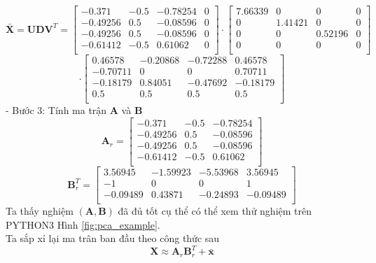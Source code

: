 \documentclass[12pt,a4paper,oneside]{report}
\numberwithin{equation}{section}
\begin{document}
\[
\bar{\mathbf{X}}=\mathbf{UDV}^{T} = \begin{bmatrix}
-0.371 & -0.5 & -0.78254 & 0 \\
-0.49256 & 0.5 & -0.08596 & 0 \\
-0.49256 & 0.5 & -0.08596 & 0 \\
-0.61412 & -0.5 & 0.61062 & 0 \\
\end{bmatrix} \cdot \begin{bmatrix}
7.66339 & 0 & 0 & 0 \\
0 & 1.41421 & 0 & 0 \\
0 & 0 & 0.52196 & 0 \\
0 & 0 & 0 & 0 \\
\end{bmatrix}
\]
\[
\cdot \begin{bmatrix}
0.46578 & -0.20868 & -0.72288 & 0.46578 \\
-0.70711 & 0 & 0 & 0.70711 \\
-0.18179 & 0.84051 & -0.47692 & -0.18179 \\
0.5 & 0.5 & 0.5 & 0.5 \\
\end{bmatrix}
\]
- Bước 3: Tính ma trận $\mathbf{A}$ và $\mathbf{B}$
\begin{equation}
	\mathbf{A}_r = \begin{bmatrix}
	-0.371 & -0.5 & -0.78254  \\
	-0.49256 & 0.5 & -0.08596 \\
	-0.49256 & 0.5 & -0.08596  \\
	-0.61412 & -0.5 & 0.61062 \\
\end{bmatrix}
\end{equation}
\begin{equation}
	\mathbf{B}_r^{T} =\begin{bmatrix}
3.56945 & -1.59923 & -5.53968 & 3.56945 \\
-1 & 0 & 0 & 1 \\
-0.09489 & 0.43871 & -0.24893 & -0.09489 \\
	\end{bmatrix}
\end{equation}
Ta thấy nghiệm $(\mathbf{A, B})$ đã đủ tốt cụ thể có thể xem thử nghiệm trên PYTHON3 Hình \ref{fig:pca_example}.\\
Ta sắp xỉ lại ma trân ban đầu theo công thức sau 
\begin{equation} 
	\mathbf{X} \approx \mathbf{A}_r\mathbf{B}_r^{T}+ \bar{\mathbf{x}} 
\end{equation} 
\end{document}
